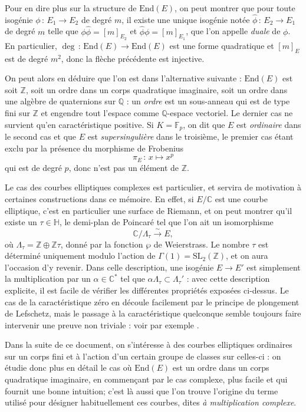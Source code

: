 \documentclass[11pt,a4paper]{article}
\newcommand{\Z}{\mathbb{Z}}
\newcommand{\C}{\mathbb{C}}
\newcommand{\F}{\mathbb{F}}
\newcommand{\Q}{\mathbb{Q}}
\renewcommand{\H}{\mathbb{H}}
\newcommand{\vers}{\longrightarrow}
\newcommand{\End}{\mathrm{End}}
\newcommand{\de}{\,:\,}
\theoremstyle{definition}
\begin{document}
Pour en dire plus sur la structure de $\End(E)$, on peut montrer que pour toute isogénie $\phi\de E_1\vers E_2$ de degré $m$, il existe une unique isogénie notée $\widehat{\phi}\de E_2\vers E_1$ de degré $m$ telle que $\phi\widehat{\phi}=[m]_{E_2}$ et $\widehat{\phi}\phi=[m]_{E_1}$, que l'on appelle \emph{duale} de $\phi$. En particulier, $\deg \de\End(E)\vers \End(E)$ est une forme quadratique et $[m]_E$ est de degré $m^2$, donc la flèche précédente est injective.

On peut alors en déduire que l'on est dans l'alternative suivante : $\End(E)$ est soit $\Z$, soit un ordre dans un corps quadratique imaginaire, soit un ordre dans une algèbre de quaternions sur $\Q$ : un \emph{ordre} est un sous-anneau qui est de type fini sur $\Z$ et engendre tout l'espace comme $\Q$-espace vectoriel. Le dernier cas ne survient qu'en caractéristique positive. Si $K = \F_p$, on dit que $E$ est \emph{ordinaire} dans le second cas et que $E$ est \emph{supersingulière} dans le troisième, le premier cas étant exclu par la présence du morphisme de Frobenius
$$\pi_E\de x\mapsto x^p$$
qui est de degré $p$, donc n'est pas un élément de $\Z$.

Le cas des courbes elliptiques complexes est particulier, et servira de motivation à certaines constructions dans ce mémoire. En effet, si $E/\C$ est une courbe elliptique, c'est en particulier une surface de Riemann,  et on peut montrer qu'il existe un $\tau\in \H$, le demi-plan de Poincaré tel que l'on ait un isomorphisme
$$\C/\Lambda_\tau \overset{\sim}{\vers} E,$$
où $\Lambda_\tau = \Z\oplus \Z\tau$, donné par la fonction $\wp$ de Weierstrass. Le nombre $\tau$ est déterminé uniquement modulo l'action de $\Gamma(1) = \mathrm{SL}_2(\Z)$, et on aura l'occasion d'y revenir. Dans celle description, une isogénie $E\vers E'$ est simplement la multiplication par un $\alpha\in \C^*$ tel que $\alpha \Lambda_\tau \subset \Lambda_\tau'$ : avec cette description explicite, il est facile de vérifier les différentes propriétés exposées ci-dessus. Le cas de la caractéristique zéro en découle facilement par le principe de plongement de Lefschetz, mais le passage à la caractéristique quelconque semble toujours faire intervenir une preuve non triviale : voir par exemple \cite{Nekovar}.

Dans la suite de ce document, on s'intéresse à des courbes elliptiques ordinaires sur un corps fini et à l'action d'un certain groupe de classes sur celles-ci : on étudie donc plus en détail le cas où $\End(E)$ est un ordre dans un corps quadratique imaginaire, en commençant par le cas complexe, plus facile et qui fournit une bonne intuition; c'est là aussi que l'on trouve l'origine du terme utilisé pour désigner habituellement ces courbes, dites \emph{à multiplication complexe}.
\end{document}
